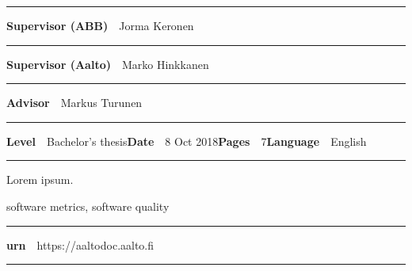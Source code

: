 \begin{spacing}{.88}
{\vspace{-2.4mm}\rule{\textwidth}{.75pt}

{\fontsize{10.5pt}{10.5pt}\bfseries\sffamily\lsstyle Supervisor (ABB)}~~{\small Jorma Keronen}

\vspace{-2.4mm}\rule{\textwidth}{.75pt}

{\fontsize{10.5pt}{10.5pt}\bfseries\sffamily\lsstyle Supervisor (Aalto)}~~{\small Marko Hinkkanen}

\vspace{-2.4mm}\rule{\textwidth}{.75pt}

{\fontsize{10.5pt}{10.5pt}\bfseries\sffamily\lsstyle Advisor}~~{\small Markus Turunen}

\vspace{-2.4mm}\rule{\textwidth}{.75pt}

{\fontsize{10.5pt}{10.5pt}\bfseries\sffamily\lsstyle Level}~~{\small Bachelor's thesis}\hfill{\fontsize{10.5pt}{10.5pt}\bfseries\sffamily\lsstyle Date}~~{\small 8 Oct 2018}\hfill{\fontsize{10.5pt}{10.5pt}\bfseries\sffamily\lsstyle Pages}~~{\small 7}\hfill{\fontsize{10.5pt}{10.5pt}\bfseries\sffamily\lsstyle Language}~~{\small English}

\vspace{-2.4mm}\rule{\textwidth}{.75pt}

\vspace{6mm}

} %
\end{spacing}
\begin{spacing}{1.05}

\vspace{.8mm}

{\small
  Lorem ipsum.
}

\vfill

\end{spacing}
\begin{spacing}{.88}
{\parindent0pt %

\parbox[t]{123.6mm}{\raggedright\small software metrics, software quality}

\vspace{.5mm}\rule{\textwidth}{.75pt}

{\fontsize{10.5pt}{10.5pt}\bfseries\sffamily\lsstyle urn}~~{\small https://aaltodoc.aalto.fi}

\vspace{-2.4mm}\rule{\textwidth}{.75pt}

} %
\end{spacing}



